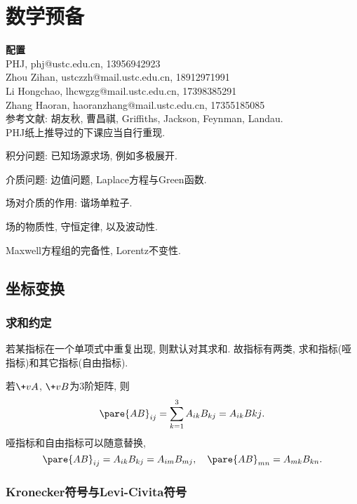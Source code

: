 \documentclass[hidelinks]{ctexart}
\begin{document}
\section{数学预备} %
\label{sec:数学预备}

\noindent\textbf{配置}\\[.5em]
\noindent
PHJ, phj@ustc.edu.cn, 13956942923\\
Zhou Zihan, ustczzh@mail.ustc.edu.cn, 18912971991\\
Li Hongchao, lhcwgzg@mail.ustc.edu.cn, 17398385291\\
Zhang Haoran, haoranzhang@mail.ustc.edu.cn, 17355185085\\
参考文献: 胡友秋, 曹昌祺, Griffiths, Jackson, Feynman, Landau.\\
PHJ纸上推导过的下课应当自行重现. \\
\begin{cenum}
    \item 积分问题: 已知场源求场, 例如多极展开.
    \item 介质问题: 边值问题, Laplace方程与Green函数.
    \item 场对介质的作用: 谐场单粒子.
    \item 场的物质性, 守恒定律, 以及波动性.
    \item Maxwell方程组的完备性, Lorentz不变性.
\end{cenum}

\subsection{坐标变换} %
\label{sub:坐标变换}

\subsubsection{求和约定} %
\label{ssub:求和约定}

若某指标在一个单项式中重复出现, 则默认对其求和. 故指标有两类, 求和指标(哑指标)和其它指标(自由指标).
\begin{ex}
    若$\+vA$, $\+vB$为$3$阶矩阵, 则
    \[ \pare{AB}_{ij} = \sum_{k=1}^3 A_{ik}B_{kj} = A_{ik}B{kj}. \]
    哑指标和自由指标可以随意替换,
    \[ \pare{AB}_{ij} = A_{ik}B_{kj} = A_{im}B_{mj},\quad \pare{AB}_{mn} = A_{mk}B_{kn}. \]
\end{ex}


\subsubsection{Kronecker符号与Levi-Civita符号} %
\label{ssub:kronecker符号与levi_civita符号}
\end{document}
